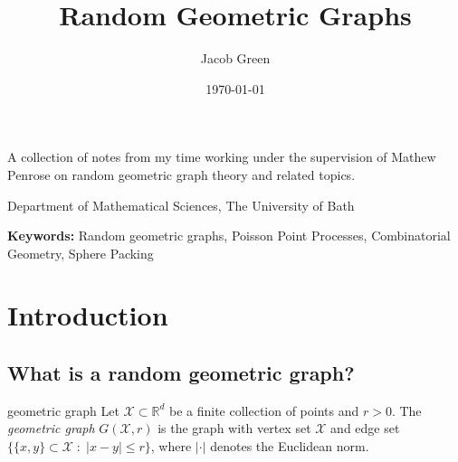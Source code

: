 \documentclass{article}
\title{Random Geometric Graphs}
\author{Jacob Green}
\date{\today}
\newcommand{\subtitle}{A collection of notes from my time working under the supervision of Mathew Penrose on 
random geometric graph theory and related topics.}
\newcommand{\institution}{Department of Mathematical Sciences, The University of Bath}
\newcommand{\keywords}{Random geometric graphs, Poisson Point Processes, Combinatorial Geometry, Sphere Packing}
\newcounter{globaltcb} %
\begin{document}
\begin{titlepage}
    \centering
    
    {\Huge \bfseries \thetitle \par}
    \vspace{0.5cm}
    
    {\Large \subtitle \par}
    \vspace{1cm}
    
    {\large \theauthor \par}
    {\institution \par}
    \vspace{1cm}
    
    {\large \thedate \par}
    \vspace{1.5cm}
    
    \begin{abstract}
        \lipsum[10]
    \end{abstract}
    \vspace{1cm}
    
    \textbf{Keywords:} \keywords
    \vfill %
    
    \textit{}
\end{titlepage}

\newpage

\tableofcontents 

\newpage 

\setcounter{page}{1} %

\section{Introduction}

\setcounter{globaltcb}{1} %

\subsection{What is a random geometric graph?}

\begin{definition}[]{geometric graph}
    Let $\mathcal{X} \subset \mathbb{R}^d$ be a finite collection of points and $r > 0$. The {\it geometric graph}
    $G(\mathcal{X}, r)$ is the graph with vertex set $\mathcal{X}$ and edge set $\{\{x, y\} \subset \mathcal{X} 
    \; : \; \lvert x - y \rvert \leq r\}$, where $\lvert \cdot \rvert$ denotes the Euclidean norm. 
\end{definition}
\end{document}

